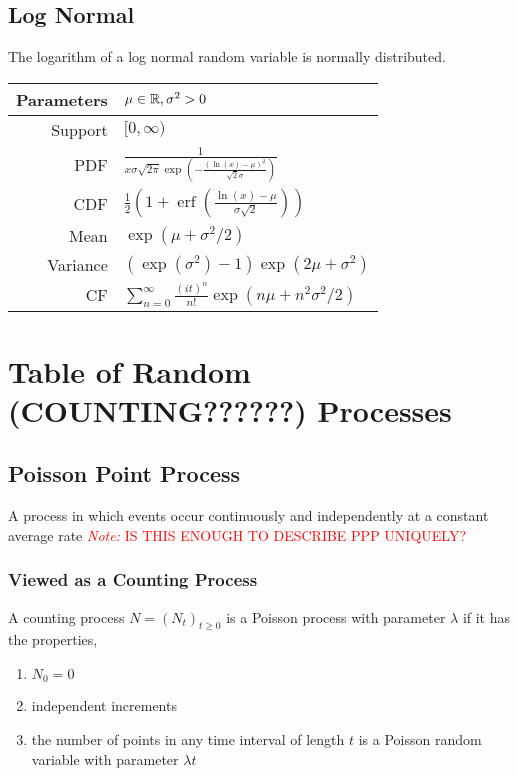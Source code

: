 \documentclass[12pt]{article}
\newcommand{\note}[1]{\textcolor{red}{\textit{Note:} #1}}
\begin{document}
\subsection{Log Normal}
The logarithm of a log normal random variable is normally distributed.
\begin{center}
\def\arraystretch{1.5}
\begin{tabular}{|r|l|} \hline
    Parameters & \( \mu\in\mathbb{R}, \sigma^2 > 0 \) \\ \hline
    Support & \( [0,\infty) \) \\ \hline
    PDF & \( \frac{1}{x\sigma\sqrt{2\pi } \exp \left( - \frac{(\ln(x)-\mu)^2}{\sqrt{2}\sigma} \right)} \) \\ \hline 
    CDF & \( \frac{1}{2} \left( 1+\operatorname{erf} \left( \frac{\ln(x)-\mu}{\sigma\sqrt{2}} \right) \right) \) \\ \hline
    Mean & \( \exp(\mu + \sigma^2/2) \) \\ \hline
    Variance & \( \left( \exp(\sigma^2)-1 \right)\exp(2\mu+\sigma^2) \) \\ \hline
    CF & \( \sum_{n=0}^{\infty} \frac{(it)^n}{n!}\exp(n \mu +n^2\sigma^2/2) \)\\ \hline
\end{tabular}
\end{center}




\pagebreak
\section{Table of Random (COUNTING??????) Processes}

\subsection{Poisson Point Process}
A process in which events occur continuously and independently at a constant average rate \note{IS THIS ENOUGH TO DESCRIBE PPP UNIQUELY?}

\subsubsection{Viewed as a Counting Process}
A counting process \( N = (N_t)_{t\geq 0} \) is a Poisson process with parameter \( \lambda \) if it has the properties,
\begin{enumerate}[nolistsep]
    \item \( N_0 = 0 \)
    \item independent increments
    \item the number of points in any time interval of length \( t \) is a Poisson random variable with parameter \( \lambda t \)
\end{enumerate}
\end{document}

